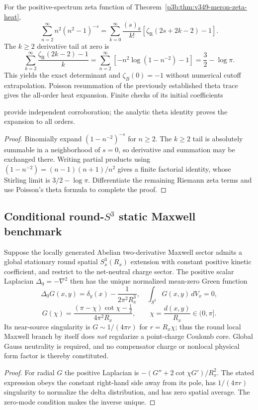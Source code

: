 \documentclass[11pt,a4paper]{article}
\begin{document}
\begin{proposition}
\label{p3g:prop:v349-meron-zeta-certificate}
For the positive-spectrum zeta function of
Theorem~\ref{p3b:thm:v349-meron-zeta-heat},
\[
 \sum_{n=2}^\infty n^2(n^2-1)^{-s}
 =\sum_{k=0}^\infty\frac{(s)_k}{k!}
  [\zeta_{\mathrm R}(2s+2k-2)-1].
\]
The $k\ge2$ derivative tail at zero is
\[
 \sum_{k=2}^\infty\frac{\zeta_{\mathrm R}(2k-2)-1}{k}
 =\sum_{n=2}^\infty[-n^2\log(1-n^{-2})-1]
 =\frac32-\log\pi.
\]
This yields the exact determinant and $\zeta_B(0)=-1$
without numerical cutoff extrapolation.  Poisson resummation of
the previously established theta trace gives the all-order
heat expansion. Finite checks of its initial coefficients

provide independent corroboration; the analytic theta identity
proves the expansion to all orders.
\end{proposition}
\begin{proof}
Binomially expand $(1-n^{-2})^{-s}$ for $n\ge2$.
The $k\ge2$ tail is absolutely summable in a neighborhood of
$s=0$, so derivative and summation may be exchanged there.
Writing partial products using
$(1-n^{-2})=(n-1)(n+1)/n^2$ gives a finite factorial
identity, whose Stirling limit is $3/2-\log\pi$.
Differentiate the remaining Riemann zeta terms and use
Poisson's theta formula to complete the proof.
\end{proof}

\subsection{Conditional round-\texorpdfstring{$S^3$}{S3} static Maxwell benchmark}
\label{p3g:sec:v340-s3lit-maxwell-benchmark}
\begin{proposition}
\label{p3g:prop:v340-s3lit-round-coulomb}
Suppose the locally generated Abelian two-derivative Maxwell sector
admits a global stationary round spatial $S^3_x(R_x)$ extension
with constant positive kinetic coefficient, and restrict to the
net-neutral charge sector.  The positive scalar Laplacian
$\Delta_0=-\nabla^2$ then has the unique normalized mean-zero
Green function
\[
 \Delta_0G(x,y)=\delta_y(x)-\frac1{2\pi^2R_x^3},
 \quad\int_{S^3}G(x,y)\,dV_x=0,
\]
\[
 \boxed{G(\chi)=\frac{(\pi-\chi)\cot\chi-\frac12}{4\pi^2R_x}},
 \qquad\chi=\frac{d(x,y)}{R_x}\in(0,\pi].
\]
Its near-source singularity is $G\sim1/(4\pi r)$ for $r=R_x\chi$;
thus the round local Maxwell branch by itself does \emph{not}
regularize a point-charge Coulomb core.  Global Gauss neutrality
is required, and no compensator charge or nonlocal physical
form factor is thereby constituted.
\end{proposition}
\begin{proof}
For radial $G$ the positive Laplacian is
$-(G''+2\cot\chi G')/R_x^2$.  The stated expression obeys the
constant right-hand side away from its pole, has $1/(4\pi r)$
singularity to normalize the delta distribution, and has zero
spatial average.  The zero-mode condition makes the inverse unique.
\end{proof}
\end{document}
